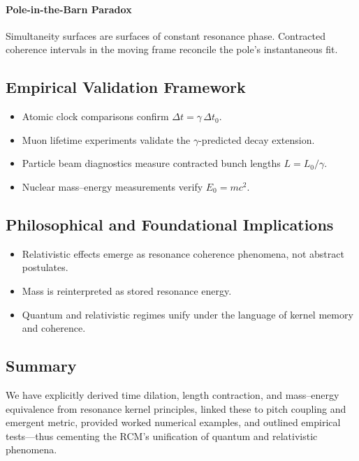 \paragraph{Pole-in-the-Barn Paradox}  
Simultaneity surfaces are surfaces of constant resonance phase. Contracted coherence intervals in the moving frame reconcile the pole’s instantaneous fit.

\subsection{Empirical Validation Framework}

\begin{itemize}
  \item Atomic clock comparisons confirm \(\Delta t=\gamma\,\Delta t_0\).
  \item Muon lifetime experiments validate the \(\gamma\)-predicted decay extension.
  \item Particle beam diagnostics measure contracted bunch lengths \(L=L_0/\gamma\).
  \item Nuclear mass–energy measurements verify \(E_0=mc^2\).
\end{itemize}

\subsection{Philosophical and Foundational Implications}

\begin{itemize}
  \item Relativistic effects emerge as resonance coherence phenomena, not abstract postulates.
  \item Mass is reinterpreted as stored resonance energy.
  \item Quantum and relativistic regimes unify under the language of kernel memory and coherence.
\end{itemize}

\subsection{Summary}

We have explicitly derived time dilation, length contraction, and mass–energy equivalence from resonance kernel principles, linked these to pitch coupling and emergent metric, provided worked numerical examples, and outlined empirical tests—thus cementing the RCM’s unification of quantum and relativistic phenomena.

